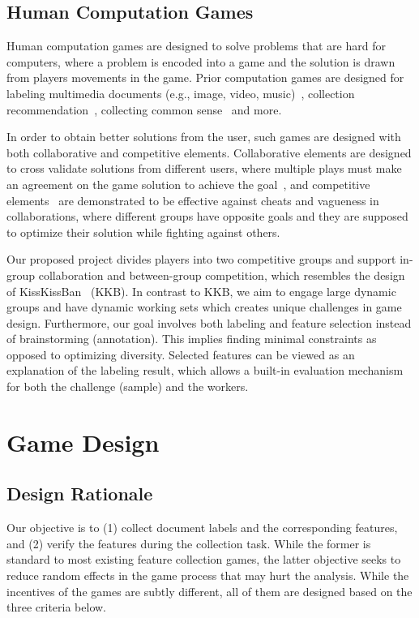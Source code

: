 \documentclass[chi_draft]{sigchi}
\begin{document}
\subsection{Human Computation Games}
Human computation games are designed to solve problems that are hard for computers, where a problem is encoded into a game and the solution is drawn from players movements in the game. Prior computation games are designed for labeling multimedia documents (e.g., image, video, music)~\cite{vonAhn:2004:LIC:985692.985733,ho2009kisskissban,vonAhn:2006:PGL:1124772.1124782,Seneviratne:2010:IFI:1743384.1743473,law2007tagatune}, collection recommendation~\cite{walsh2010curator}, collecting common sense~\cite{von2006verbosity} and more. 

In order to obtain better solutions from the user, such games are designed with both collaborative and competitive elements. Collaborative elements are designed to cross validate solutions from different users, where multiple plays must make an agreement on the game solution to achieve the goal~\cite{vonAhn:2006:PGL:1124772.1124782}, and competitive elements~\cite{ho2009kisskissban} are demonstrated to be effective against cheats and vagueness in collaborations, where different groups have opposite goals and they are supposed to optimize their solution while fighting against others.

Our proposed project divides players into two competitive groups and support in-group collaboration and between-group competition, which resembles the design of KissKissBan~\cite{ho2009kisskissban} (KKB). In contrast to KKB, we aim to engage large dynamic groups and have dynamic working sets which creates unique challenges in game design. Furthermore, our goal involves both labeling and feature selection instead of brainstorming (annotation). This implies finding minimal constraints as opposed to optimizing diversity. Selected features can be viewed as an explanation of the labeling result, which allows a built-in evaluation mechanism for both the challenge (sample) and the workers. 


\section{Game Design}

\subsection{Design Rationale}
Our objective is to (1) collect document labels and the corresponding features, and (2) verify the features during the collection task. While the former is standard to most existing feature collection games, the latter objective seeks to reduce random effects in the game process that may hurt the analysis.
While the incentives of the games are subtly different, all of them are designed based on the three criteria below.
\end{document}
